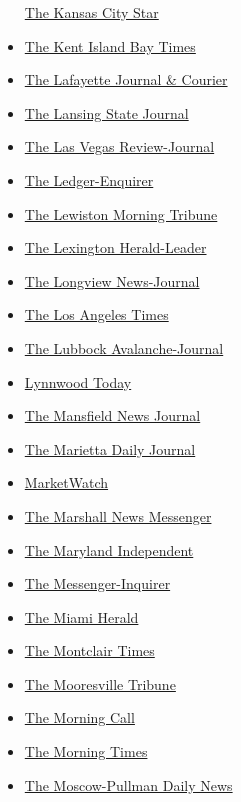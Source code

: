 \begin{itemize}
  \href{https://www.kansascity.com/}{The Kansas City Star}
\item
  \href{https://www.myeasternshoremd.com/qa/bay_times/}{The Kent Island
  Bay Times}
\item
  \href{https://www.jconline.com/}{The Lafayette Journal \& Courier}
\item
  \href{https://www.lansingstatejournal.com/}{The Lansing State Journal}
\item
  \href{https://www.reviewjournal.com/}{The Las Vegas Review-Journal}
\item
  \href{https://www.ledger-enquirer.com/}{The Ledger-Enquirer}
\item
  \href{https://lmtribune.com/}{The Lewiston Morning Tribune}
\item
  \href{https://www.kentucky.com/}{The Lexington Herald-Leader}
\item
  \href{https://www.news-journal.com/}{The Longview News-Journal}
\item
  \href{https://www.latimes.com/}{The Los Angeles Times}
\item
  \href{https://www.lubbockonline.com/}{The Lubbock Avalanche-Journal}
\item
  \href{https://lynnwoodtoday.com/}{Lynnwood Today}
\item
  \href{https://www.mansfieldnewsjournal.com/}{The Mansfield News
  Journal}
\item
  \href{https://www.mdjonline.com/}{The Marietta Daily Journal}
\item
  \href{https://www.marketwatch.com/}{MarketWatch}
\item
  \href{https://www.marshallnewsmessenger.com/}{The Marshall News
  Messenger}
\item
  \href{https://www.somdnews.com/independent/}{The Maryland Independent}
\item
  \href{https://www.messenger-inquirer.com/}{The Messenger-Inquirer}
\item
  \href{https://www.miamiherald.com/}{The Miami Herald}
\item
  \href{https://www.northjersey.com/local/montclair/}{The Montclair
  Times}
\item
  \href{https://www.mooresvilletribune.com/}{The Mooresville Tribune}
\item
  \href{https://www.mcall.com/}{The Morning Call}
\item
  \href{http://www.morning-times.com/}{The Morning Times}
\item
  \href{https://dnews.com/}{The Moscow-Pullman Daily News}

\end{itemize}
